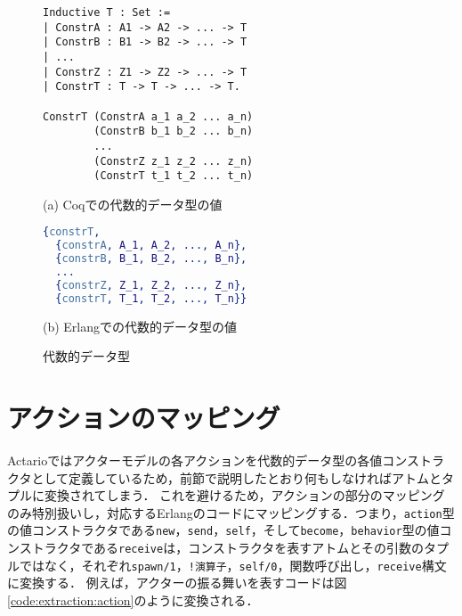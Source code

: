 \begin{figure}\centering
\begin{minipage}{1\textwidth}\centering
\begin{lstlisting}[frame=single,numbers=none,xleftmargin=0pt]
Inductive T : Set :=
| ConstrA : A1 -> A2 -> ... -> T
| ConstrB : B1 -> B2 -> ... -> T
| ...
| ConstrZ : Z1 -> Z2 -> ... -> T
| ConstrT : T -> T -> ... -> T.

ConstrT (ConstrA a_1 a_2 ... a_n)
        (ConstrB b_1 b_2 ... b_n)
        ...
        (ConstrZ z_1 z_2 ... z_n)
        (ConstrT t_1 t_2 ... t_n)
\end{lstlisting}
(a) Coqでの代数的データ型の値
\end{minipage}
\begin{minipage}{1\textwidth}\centering
\begin{lstlisting}[frame=single,numbers=none,xleftmargin=0pt,language=Erlang]
{constrT,
  {constrA, A_1, A_2, ..., A_n},
  {constrB, B_1, B_2, ..., B_n},
  ...
  {constrZ, Z_1, Z_2, ..., Z_n},
  {constrT, T_1, T_2, ..., T_n}}
\end{lstlisting}
(b) Erlangでの代数的データ型の値
\end{minipage}
\label{code:extraction:adt}
\caption{代数的データ型}
\end{figure}

\section{アクションのマッピング}

Actarioではアクターモデルの各アクションを代数的データ型の各値コンストラクタとして定義しているため，前節で説明したとおり何もしなければアトムとタプルに変換されてしまう．
これを避けるため，アクションの部分のマッピングのみ特別扱いし，対応するErlangのコードにマッピングする．つまり，\lstinline{action}型の値コンストラクタである\lstinline{new}，\lstinline{send}，\lstinline{self}，そして\lstinline{become}，\lstinline{behavior}型の値コンストラクタである\lstinline{receive}は，コンストラクタを表すアトムとその引数のタプルではなく，それぞれ\lstinline{spawn/1}，\lstinline{!演算子}，\lstinline{self/0}，関数呼び出し，\lstinline{receive}構文に変換する．
例えば，アクターの振る舞いを表すコードは図\ref{code:extraction:action}のように変換される．

